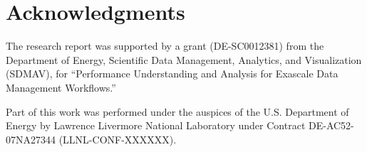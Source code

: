 %


\section{Acknowledgments}

The research report was supported by a grant (DE-SC0012381) from the
Department of Energy, Scientific Data Management, Analytics, and
Visualization (SDMAV), for ``Performance Understanding and Analysis
for Exascale Data Management Workflows.''

Part of this work was performed under the auspices of the
U.S. Department of Energy by Lawrence Livermore National Laboratory
under Contract DE-AC52-07NA27344 (LLNL-CONF-XXXXXX).



